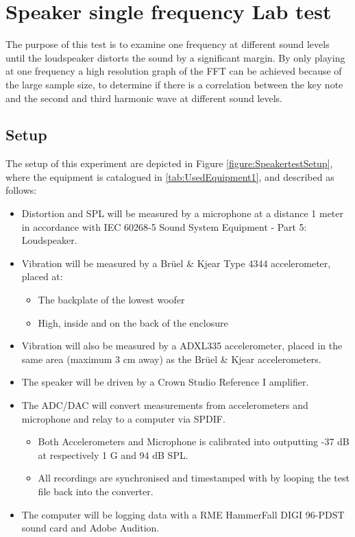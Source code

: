 \chapter{Speaker single frequency Lab test} \label{app:journal_speaker_test2}

The purpose of this test is to examine one frequency at different sound levels until the loudspeaker distorts the sound by a significant margin. By only playing at one frequency a high resolution graph of the FFT can be achieved because of the large sample size, to determine if there is a correlation between the key note and the second and third harmonic wave at different sound levels.


\section{Setup}

The setup of this experiment are depicted in Figure \ref{figure:SpeakertestSetup}, where the equipment is catalogued in \autoref{tab:UsedEquipment1}, and described as follows:

\begin{itemize}
\item Distortion and \gls{SPL} will be measured by a microphone at a distance 1 meter in accordance with IEC 60268-5 Sound System Equipment - Part 5: Loudspeaker.
\item Vibration will be measured by a Brüel \& Kjear Type 4344 accelerometer, placed at:
\begin{itemize}
\item The backplate of the lowest woofer
\item High, inside and on the back of the enclosure 
\end{itemize}
\item Vibration will also be measured by a ADXL335 accelerometer, placed in the same area (maximum 3 cm away) as the Brüel \& Kjear accelerometers. 
\item The speaker will be driven by a Crown Studio Reference I amplifier.
\item The ADC/DAC will convert measurements from accelerometers and microphone and relay to a computer via SPDIF.
\begin{itemize}
\item Both Accelerometers and Microphone is calibrated into outputting -37 dB at respectively 1 G and 94 dB \gls{SPL}.
\item All recordings are synchronised and timestamped with by looping the test file back into the converter.
\end{itemize}
\item The computer will be logging data with a RME HammerFall DIGI 96-PDST sound card and Adobe Audition.
\end{itemize}

